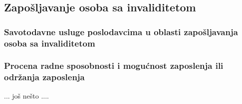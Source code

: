 \subsection{Zapo\v sljavanje osoba sa invaliditetom}

\subsubsection{Savotodavne usluge poslodavcima u oblasti zapo\v sljavanja osoba sa invaliditetom}

\subsubsection{Procena radne sposobnosti i mogu\' cnost zaposlenja ili odr\v zanja zaposlenja}

... jo\v s ne\v sto ....


